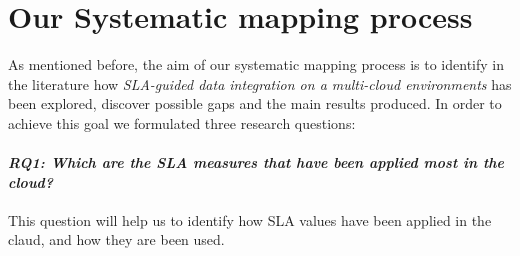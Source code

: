 \section{Our Systematic mapping process}\label{sec:sm}


 




As mentioned before, the aim of our systematic mapping process is to identify in
the literature how \textit{SLA-guided data integration on a multi-cloud
environments} has been explored, discover possible gaps and the main results
produced.
In order to achieve this goal we formulated three research questions:

\paragraph{\textit{\textbf{RQ1:} Which are the SLA measures that have been
applied most in the cloud?}} This question will help us to identify how SLA
values have been applied in the claud, and how they are been used.

